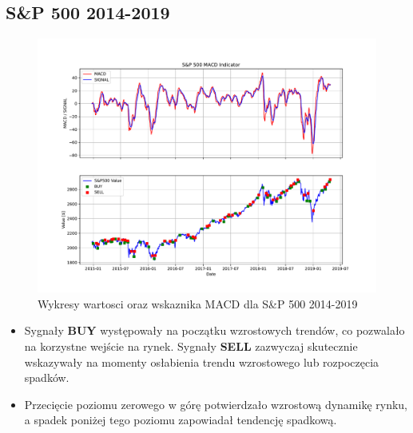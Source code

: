 \documentclass[12pt, letterpaper]{article}
\begin{document}
\subsection{S\&P 500 2014-2019}
\begin{figure}[h!]
    \centering
    \includegraphics[width=\linewidth]{MACD S&P500 from 0.pdf}
    \caption{Wykresy wartosci oraz wskaznika MACD dla S\&P 500 2014-2019}
    \label{fig:sp500_2014_2017}
\end{figure}

\begin{itemize}
\item Sygnały \textbf{BUY} występowały na początku wzrostowych trendów, co pozwalało na korzystne wejście na rynek. Sygnały \textbf{SELL} zazwyczaj skutecznie wskazywały na momenty osłabienia trendu wzrostowego lub rozpoczęcia spadków.
\item Przecięcie poziomu zerowego w górę potwierdzało wzrostową dynamikę rynku, a spadek poniżej tego poziomu zapowiadał tendencję spadkową.
\end{itemize}

\vspace{5cm}  %
\end{document}
